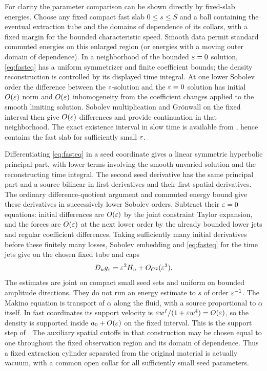 For clarity the parameter comparison can be shown directly by fixed-slab energies. Choose any fixed compact fast slab \(0\leq s\leq S\) and a ball containing the eventual extraction tube and the domains of dependence of its collars, with a fixed margin for the bounded characteristic speed. Smooth data permit standard commuted energies on this enlarged region (or energies with a moving outer domain of dependence). In a neighborhood of the bounded \(\varepsilon=0\) solution, \eqref{eq:fasteq} has a uniform symmetrizer and finite coefficient bounds; the density reconstruction is controlled by its displayed time integral. At one lower Sobolev order the difference between the \(\varepsilon\)-solution and the \(\varepsilon=0\) solution has initial \(O(\varepsilon)\) norm and \(O(\varepsilon)\) inhomogeneity from the coefficient changes applied to the smooth limiting solution. Sobolev multiplication and Gr\"onwall on the fixed interval then give \(O(\varepsilon)\) differences and provide continuation in that neighborhood. The exact existence interval in slow time is available from \cite[Prop.~4.3, Thm.~1.1]{Oliynyk}, hence contains the fast slab for sufficiently small \(\varepsilon\).

Differentiating \eqref{eq:fasteq} in a seed coordinate gives a linear symmetric hyperbolic principal part, with lower terms involving the smooth unvaried solution and the reconstructing time integral. The second seed derivative has the same principal part and a source bilinear in first derivatives and their first spatial derivatives. The ordinary difference-quotient argument and commuted energy bound give these derivatives in successively lower Sobolev orders. Subtract their \(\varepsilon=0\) equations: initial differences are \(O(\varepsilon)\) by the joint constraint Taylor expansion, and the forces are \(O(\varepsilon)\) at the next lower order by the already bounded lower jets and regular coefficient differences. Taking sufficiently many initial derivatives before these finitely many losses, Sobolev embedding and \eqref{eq:fasteq} for the time jets give on the chosen fixed tube and caps
\begin{equation}
             D_u g_\varepsilon=\varepsilon^2 H_u+O_{C^2}(\varepsilon^3).
             \label{eq:fasttangent}
\end{equation}
The estimates are joint on compact small seed sets and uniform on bounded amplitude directions. They do not run an energy estimate to \(s\) of order \(\varepsilon^{-1}\). The Makino equation is transport of \(\alpha\) along the fluid, with a source proportional to \(\alpha\) itself. In fast coordinates its support velocity is \(\varepsilon w^I/(1+\varepsilon w^4)=O(\varepsilon)\), so the density is supported inside \(a_0+O(\varepsilon)\) on the fixed interval. This is the support step of \cite[Prop.~4.3]{Oliynyk}. The auxiliary spatial cutoffs in that construction may be chosen equal to one throughout the fixed observation region and its domain of dependence. Thus a fixed extraction cylinder separated from the original material is actually vacuum, with a common open collar for all sufficiently small seed parameters.

